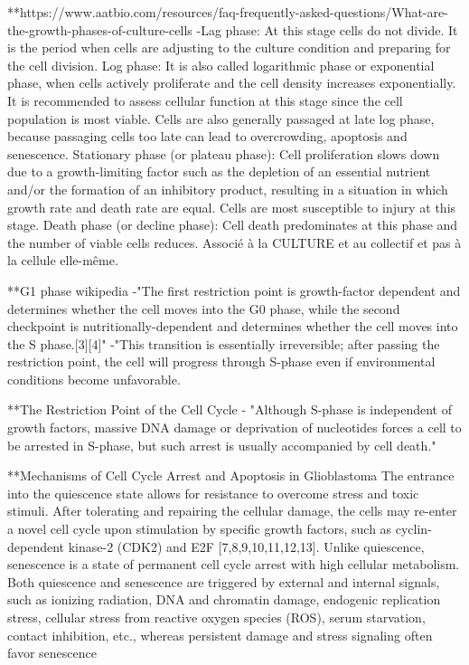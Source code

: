 \documentclass[11pt,a4paper]{article}
\begin{document}
**https://www.aatbio.com/resources/faq-frequently-asked-questions/What-are-the-growth-phases-of-culture-cells
-Lag phase: At this stage cells do not divide. It is the period when cells are adjusting to the culture condition and preparing for the cell division.
    Log phase: It is also called logarithmic phase or exponential phase, when cells actively proliferate and the cell density increases exponentially. It is recommended to assess cellular function at this stage since the cell population is most viable. Cells are also generally passaged at late log phase, because passaging cells too late can lead to overcrowding, apoptosis and senescence.
    Stationary phase (or plateau phase): Cell proliferation slows down due to a growth-limiting factor such as the depletion of an essential nutrient and/or the formation of an inhibitory product, resulting in a situation in which growth rate and death rate are equal. Cells are most susceptible to injury at this stage.
    Death phase (or decline phase): Cell death predominates at this phase and the number of viable cells reduces.
Associé à la CULTURE et au collectif et pas à la cellule elle-même.

**G1 phase wikipedia
-"The first restriction point is growth-factor dependent and determines whether the cell moves into the G0 phase, while the second checkpoint is nutritionally-dependent and determines whether the cell moves into the S phase.[3][4]"
-"This transition is essentially irreversible; after passing the restriction point, the cell will progress through S-phase even if environmental conditions become unfavorable.

**The Restriction Point of the Cell Cycle
- "Although S-phase is independent of growth factors, massive DNA damage or deprivation of nucleotides forces a cell to be arrested in S-phase, but such arrest is usually accompanied by cell death."

**Mechanisms of Cell Cycle Arrest and Apoptosis in Glioblastoma
The entrance into the quiescence state allows for resistance to overcome stress and toxic stimuli. After tolerating and repairing the cellular damage, the cells may re-enter a novel cell cycle upon stimulation by specific growth factors, such as cyclin-dependent kinase-2 (CDK2) and E2F [7,8,9,10,11,12,13].
Unlike quiescence, senescence is a state of permanent cell cycle arrest with high cellular metabolism. Both quiescence and senescence are triggered by external and internal signals, such as ionizing radiation, DNA and chromatin damage, endogenic replication stress, cellular stress from reactive oxygen species (ROS), serum starvation, contact inhibition, etc., whereas persistent damage and stress signaling often favor senescence
\end{document}
